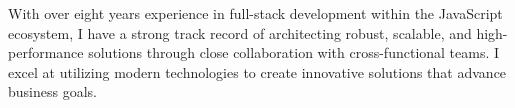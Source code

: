 


\begin{cvparagraph}
With over eight years experience in full-stack development within the JavaScript ecosystem, I have a strong track record of architecting robust, scalable, and high-performance solutions through close collaboration with cross-functional teams. I excel at utilizing modern technologies to create innovative solutions that advance business goals.
\end{cvparagraph}
